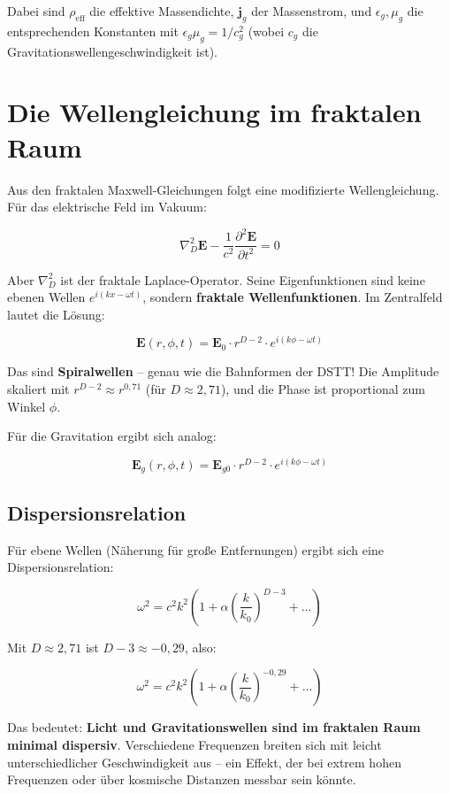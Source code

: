 \documentclass[12pt,a4paper]{article}
\begin{document}
Dabei sind \(\rho_{\text{eff}}\) die effektive Massendichte, \(\mathbf{j}_g\) der Massenstrom, und \(\epsilon_g, \mu_g\) die entsprechenden Konstanten mit \(\epsilon_g \mu_g = 1/c_g^2\) (wobei \(c_g\) die Gravitationswellengeschwindigkeit ist).

\section{Die Wellengleichung im fraktalen Raum}

Aus den fraktalen Maxwell-Gleichungen folgt eine modifizierte Wellengleichung. Für das elektrische Feld im Vakuum:

\[
\nabla_D^2 \mathbf{E} - \frac{1}{c^2} \frac{\partial^2 \mathbf{E}}{\partial t^2} = 0 \tag{9}
\]

Aber \(\nabla_D^2\) ist der fraktale Laplace-Operator. Seine Eigenfunktionen sind keine ebenen Wellen \(e^{i(kx - \omega t)}\), sondern \textbf{fraktale Wellenfunktionen}. Im Zentralfeld lautet die Lösung:

\[
\mathbf{E}(r, \phi, t) = \mathbf{E}_0 \cdot r^{D-2} \cdot e^{i(k\phi - \omega t)} \tag{10}
\]

Das sind \textbf{Spiralwellen} – genau wie die Bahnformen der DSTT! Die Amplitude skaliert mit \(r^{D-2} \approx r^{0,71}\) (für \(D \approx 2,71\)), und die Phase ist proportional zum Winkel \(\phi\).

Für die Gravitation ergibt sich analog:

\[
\mathbf{E}_g(r, \phi, t) = \mathbf{E}_{g0} \cdot r^{D-2} \cdot e^{i(k\phi - \omega t)} \tag{11}
\]

\subsection{Dispersionsrelation}

Für ebene Wellen (Näherung für große Entfernungen) ergibt sich eine Dispersionsrelation:

\[
\omega^2 = c^2 k^2 \left( 1 + \alpha \left( \frac{k}{k_0} \right)^{D-3} + \dots \right) \tag{12}
\]

Mit \(D \approx 2,71\) ist \(D-3 \approx -0,29\), also:

\[
\omega^2 = c^2 k^2 \left( 1 + \alpha \left( \frac{k}{k_0} \right)^{-0,29} + \dots \right) \tag{13}
\]

Das bedeutet: \textbf{Licht und Gravitationswellen sind im fraktalen Raum minimal dispersiv}. Verschiedene Frequenzen breiten sich mit leicht unterschiedlicher Geschwindigkeit aus – ein Effekt, der bei extrem hohen Frequenzen oder über kosmische Distanzen messbar sein könnte.
\end{document}
